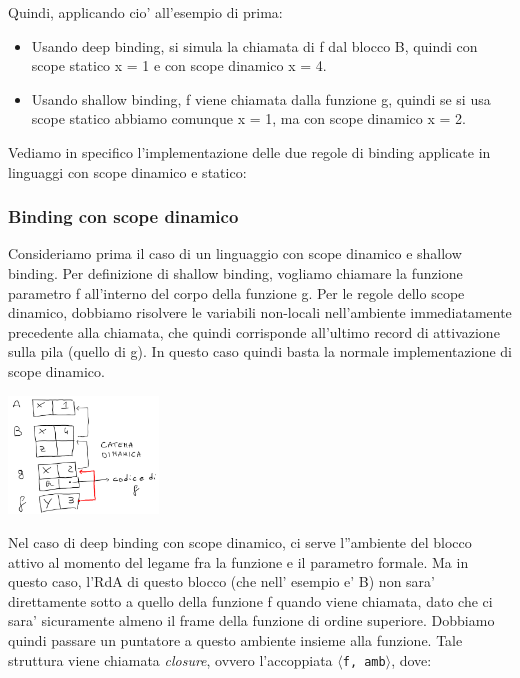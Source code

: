 Quindi, applicando cio' all'esempio di prima:
\begin{itemize}
  \item Usando deep binding, si simula la chiamata di f dal blocco B, quindi con scope statico x = 1 e con scope dinamico x = 4.
  \item Usando shallow binding, f viene chiamata dalla funzione g, quindi se si usa scope statico abbiamo comunque x = 1, ma con scope dinamico x = 2.
\end{itemize}

Vediamo in specifico l'implementazione delle due regole di binding applicate in linguaggi con scope dinamico e statico:
\subsubsection{Binding con scope dinamico}
Consideriamo prima il caso di un linguaggio con scope dinamico e shallow binding. Per definizione di shallow binding, vogliamo chiamare la funzione parametro f all'interno del corpo della funzione g. Per le regole dello scope dinamico, dobbiamo risolvere le variabili non-locali nell'ambiente immediatamente precedente alla chiamata, che quindi corrisponde all'ultimo record di attivazione sulla pila (quello di g). In questo caso quindi basta la normale implementazione di scope dinamico.

\begin{center}
  \includegraphics[width=0.3\textwidth]{img/2025-03-21-20-26-21.png}
\end{center}

Nel caso di deep binding con scope dinamico, ci serve l''ambiente del blocco attivo al momento del legame fra la funzione e il parametro formale. Ma in questo caso, l'RdA di questo blocco (che nell' esempio e' B) non sara' direttamente sotto a quello della funzione f quando viene chiamata, dato che ci sara' sicuramente almeno il frame della funzione di ordine superiore. Dobbiamo quindi passare un puntatore a questo ambiente insieme alla funzione. Tale struttura viene chiamata \textit{closure}, ovvero l'accoppiata $\langle$\texttt{f, amb}$\rangle$, dove:

